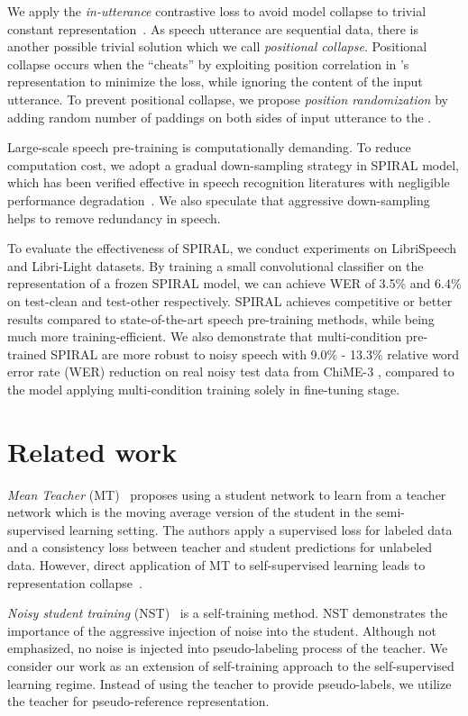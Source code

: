 We apply the \textit{in-utterance} contrastive loss to avoid model collapse to trivial constant representation~\citep{Chopra2005}. As speech utterance are sequential data, there is another possible trivial solution which we call \textit{positional collapse}. Positional collapse occurs when the \student{} ``cheats'' by exploiting position correlation in \teacher{}'s representation to minimize the loss, while ignoring the content of the input utterance.
To prevent positional collapse, we propose \textit{position randomization} by adding random number of paddings on both sides of input utterance to the \teacher{}.

Large-scale speech pre-training is computationally demanding. To reduce computation cost, we adopt a gradual down-sampling strategy in SPIRAL model, which has been verified effective in speech recognition literatures with negligible performance degradation~\citep{Peddinti2018, han20_interspeech, huang2020conv}. We also speculate that aggressive down-sampling helps to remove redundancy in speech.

To evaluate the effectiveness of SPIRAL, we conduct experiments on LibriSpeech and Libri-Light datasets.
By training a small convolutional classifier on the representation of a frozen SPIRAL model, we can achieve WER of 3.5\% and 6.4\% on \libri{} test-clean and test-other respectively.
SPIRAL achieves competitive or better results compared to state-of-the-art speech pre-training methods, while being much more training-efficient.
We also demonstrate that multi-condition pre-trained SPIRAL are more robust to noisy speech with 9.0\% - 13.3\% relative word error rate (WER) reduction on real noisy test data from ChiME-3 \citep{Barker2015}, compared to the model applying multi-condition training solely in fine-tuning stage.

\section{Related work}

\textit{Mean Teacher} (MT)~\citep{Tarvainen2017} proposes using a student network to learn from a teacher network which is the moving average version of the student in the semi-supervised learning setting. The authors apply a supervised loss for labeled data and a consistency loss between teacher and student predictions for unlabeled data.
However, direct application of MT to self-supervised learning leads to representation collapse~\citep{Grill2020}.

\textit{Noisy student training} (NST)~\citep{xie2019self, park2020improved} is a self-training method. NST demonstrates the importance of the aggressive injection of noise into the student. Although not emphasized, no noise is injected into pseudo-labeling process of the teacher. 
We consider our work as an extension of self-training approach to the self-supervised learning regime. Instead of using the teacher to provide pseudo-labels, we utilize the teacher for pseudo-reference representation.


